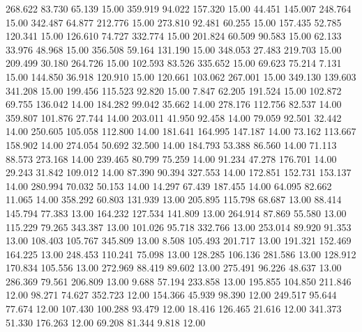  268.622   83.730   65.139        15.00
 359.919   94.022  157.320        15.00
  44.451  145.007  248.764        15.00
 342.487   64.877  212.776        15.00
 273.810   92.481   60.255        15.00
 157.435   52.785  120.341        15.00
 126.610   74.727  332.774        15.00
 201.824   60.509   90.583        15.00
  62.133   33.976   48.968        15.00
 356.508   59.164  131.190        15.00
 348.053   27.483  219.703        15.00
 209.499   30.180  264.726        15.00
 102.593   83.526  335.652        15.00
  69.623   75.214    7.131        15.00
 144.850   36.918  120.910        15.00
 120.661  103.062  267.001        15.00
 349.130  139.603  341.208        15.00
 199.456  115.523   92.820        15.00
   7.847   62.205  191.524        15.00
 102.872   69.755  136.042        14.00
 184.282   99.042   35.662        14.00
 278.176  112.756   82.537        14.00
 359.807  101.876   27.744        14.00
 203.011   41.950   92.458        14.00
  79.059   92.501   32.442        14.00
 250.605  105.058  112.800        14.00
 181.641  164.995  147.187        14.00
  73.162  113.667  158.902        14.00
 274.054   50.692   32.500        14.00
 184.793   53.388   86.560        14.00
  71.113   88.573  273.168        14.00
 239.465   80.799   75.259        14.00
  91.234   47.278  176.701        14.00
  29.243   31.842  109.012        14.00
  87.390   90.394  327.553        14.00
 172.851  152.731  153.137        14.00
 280.994   70.032   50.153        14.00
  14.297   67.439  187.455        14.00
  64.095   82.662   11.065        14.00
 358.292   60.803  131.939        13.00
 205.895  115.798   68.687        13.00
  88.414  145.794   77.383        13.00
 164.232  127.534  141.809        13.00
 264.914   87.869   55.580        13.00
 115.229   79.265  343.387        13.00
 101.026   95.718  332.766        13.00
 253.014   89.920   91.353        13.00
 108.403  105.767  345.809        13.00
   8.508  105.493  201.717        13.00
 191.321  152.469  164.225        13.00
 248.453  110.241   75.098        13.00
 128.285  106.136  281.586        13.00
 128.912  170.834  105.556        13.00
 272.969   88.419   89.602        13.00
 275.491   96.226   48.637        13.00
 286.369   79.561  206.809        13.00
   9.688   57.194  233.858        13.00
 195.855  104.850  211.846        12.00
  98.271   74.627  352.723        12.00
 154.366   45.939   98.390        12.00
 249.517   95.644   77.674        12.00
 107.430  100.288   93.479        12.00
  18.416  126.465   21.616        12.00
 341.373   51.330  176.263        12.00
  69.208   81.344    9.818        12.00
